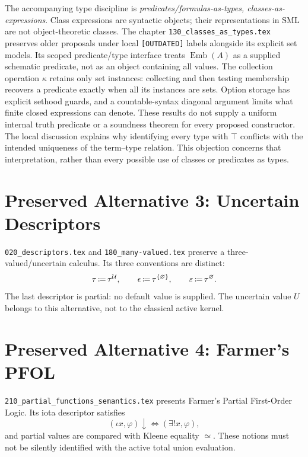 The accompanying type discipline is
\emph{predicates/formulas-as-types, classes-as-expressions}. Class expressions
are syntactic objects; their representations in SML are not object-theoretic
classes. The chapter
\texttt{130\_\allowbreak classes\_\allowbreak as\_\allowbreak types.tex}
preserves older proposals under local \texttt{[OUTDATED]} labels alongside
its explicit set models. Its scoped predicate/type interface treats
$\operatorname{Emb}(A)$ as a supplied schematic predicate, not as an
object containing all values. The collection operation $\kappa$ retains
only set instances: collecting and then testing membership recovers a
predicate exactly when all its instances are sets. Option storage has
explicit sethood guards, and a countable-syntax diagonal argument limits
what finite closed expressions can denote. These results do not supply
a uniform internal truth predicate or a soundness theorem for every
proposed constructor.
The local discussion explains why identifying every type with $\top$
conflicts with the intended uniqueness of the term--type relation. This
objection concerns that interpretation, rather than every possible use of
classes or predicates as types.

\section{Preserved Alternative 3: Uncertain Descriptors}

\texttt{020\_\allowbreak descriptors.tex} and \texttt{180\_\allowbreak many-valued.tex} preserve a
three-valued/uncertain calculus. Its three conventions are distinct:
\[
\tau\,{\coloneqq}\,\tau^{\mathcal{U}},\qquad
\epsilon\,{\coloneqq}\,\tau^{\{\varnothing\}},\qquad
\varepsilon\,{\coloneqq}\,\tau^{\varnothing}.
\]
The last descriptor is partial: no default value is supplied. The uncertain
value $U$ belongs to this alternative, not to the classical active kernel.

\section{Preserved Alternative 4: Farmer's PFOL}

\texttt{210\_\allowbreak partial\_\allowbreak functions\_\allowbreak semantics.tex} presents
Farmer's Partial First-Order Logic. Its iota descriptor satisfies
\[
(\iota x,\varphi)\downarrow\iff(\exists!x,\varphi),
\]
and partial values are compared with Kleene equality $\simeq$. These notions
must not be silently identified with the active total union evaluation.

